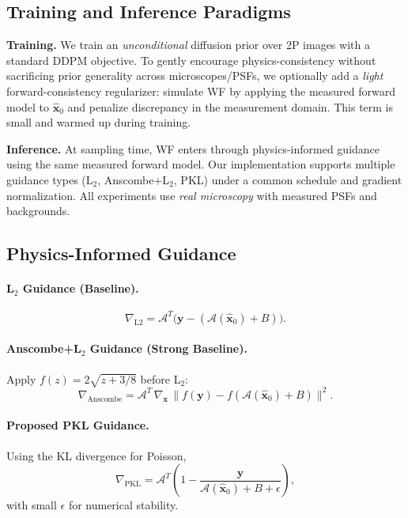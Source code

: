 \documentclass{article}
\newcommand{\wf}{WF\xspace}
\newcommand{\twop}{2P\xspace}
\begin{document}
\subsection{Training and Inference Paradigms}
\textbf{Training.} We train an \emph{unconditional} diffusion prior over \twop images with a standard DDPM objective. To gently encourage physics-consistency without sacrificing prior generality across microscopes/PSFs, we optionally add a \emph{light} forward-consistency regularizer: simulate \wf by applying the measured forward model to $\hat{\mathbf{x}}_0$ and penalize discrepancy in the measurement domain. This term is small and warmed up during training.

\textbf{Inference.} At sampling time, \wf enters through physics-informed guidance using the same measured forward model. Our implementation supports multiple guidance types (L$_2$, Anscombe+L$_2$, PKL) under a common schedule and gradient normalization. All experiments use \emph{real microscopy} with measured PSFs and backgrounds.

\subsection{Physics-Informed Guidance}
\paragraph{L$_2$ Guidance (Baseline).}
\begin{equation}
\nabla_{\text{L2}} = \mathcal{A}^T\big(\mathbf{y} - (\mathcal{A}(\hat{\mathbf{x}}_0) + B)\big).
\end{equation}

\paragraph{Anscombe+L$_2$ Guidance (Strong Baseline).}
Apply $f(z)=2\sqrt{z + 3/8}$ before L$_2$:
\begin{equation}
\nabla_{\text{Anscombe}} = \mathcal{A}^T\,\nabla_{\mathbf{x}}\,\lVert f(\mathbf{y}) - f(\mathcal{A}(\hat{\mathbf{x}}_0)+B)\rVert^2.
\end{equation}

\paragraph{Proposed PKL Guidance.}
Using the KL divergence for Poisson,
\begin{equation}
\nabla_{\text{PKL}} = \mathcal{A}^T\left(1 - \frac{\mathbf{y}}{\mathcal{A}(\hat{\mathbf{x}}_0)+B+\epsilon}\right),
\end{equation}
with small $\epsilon$ for numerical stability.
\end{document}
